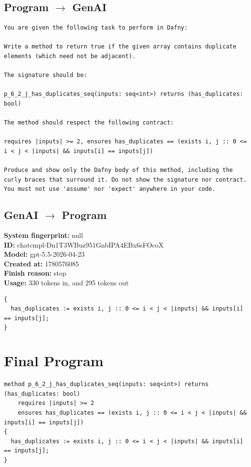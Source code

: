 \documentclass{article}
\begin{document}
\subsection*{Program $\rightarrow$ GenAI}
\begin{lstlisting}
You are given the following task to perform in Dafny:

Write a method to return true if the given array contains duplicate elements (which need not be adjacent).

The signature should be:

p_6_2_j_has_duplicates_seq(inputs: seq<int>) returns (has_duplicates: bool)

The method should respect the following contract:

requires |inputs| >= 2, ensures has_duplicates == (exists i, j :: 0 <= i < j < |inputs| && inputs[i] == inputs[j])

Produce and show only the Dafny body of this method, including the curly braces that surround it. Do not show the signature nor contract. You must not use 'assume' nor 'expect' anywhere in your code.
\end{lstlisting}
\subsection*{GenAI $\rightarrow$ Program}
\textbf{System fingerprint: }null
\\\textbf{ID: }chatcmpl-Dn1T3WBuz951GnbIPA4EBx6sFOcoX
\\\textbf{Model: }gpt-5.5-2026-04-23
\\\textbf{Created at: }1780576085
\\\textbf{Finish reason: }stop
\\\textbf{Usage: }330 tokens in, and 295 tokens out
\begin{lstlisting}
{
  has_duplicates := exists i, j :: 0 <= i < j < |inputs| && inputs[i] == inputs[j];
}
\end{lstlisting}
\section*{Final Program}
\begin{lstlisting}
method p_6_2_j_has_duplicates_seq(inputs: seq<int>) returns (has_duplicates: bool)
	requires |inputs| >= 2
	ensures has_duplicates == (exists i, j :: 0 <= i < j < |inputs| && inputs[i] == inputs[j])
{
  has_duplicates := exists i, j :: 0 <= i < j < |inputs| && inputs[i] == inputs[j];
}
\end{lstlisting}
\end{document}
